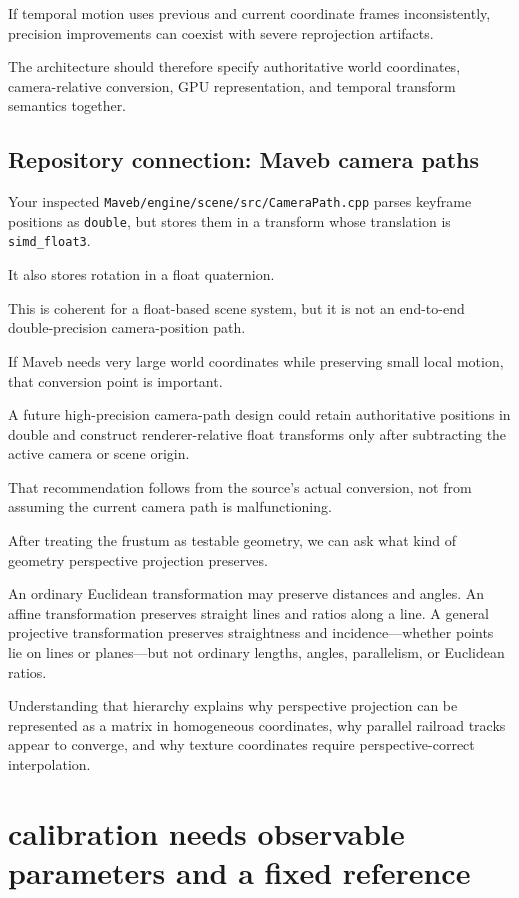 If temporal motion uses previous and current coordinate frames inconsistently, precision improvements can coexist with severe reprojection artifacts.

The architecture should therefore specify authoritative world coordinates, camera-relative conversion, GPU representation, and temporal transform semantics together.

\subsection{Repository connection: Maveb camera paths}\label{02-foundations-ii-ch036-repository-connection-maveb-camera-paths}

Your inspected \texttt{Maveb/engine/scene/src/CameraPath.cpp} parses keyframe positions as \texttt{double}, but stores them in a transform whose translation is \texttt{simd\_float3}.

It also stores rotation in a float quaternion.

This is coherent for a float-based scene system, but it is not an end-to-end double-precision camera-position path.

If Maveb needs very large world coordinates while preserving small local motion, that conversion point is important.

A future high-precision camera-path design could retain authoritative positions in double and construct renderer-relative float transforms only after subtracting the active camera or scene origin.

That recommendation follows from the source's actual conversion, not from assuming the current camera path is malfunctioning.

After treating the frustum as testable geometry, we can ask what kind of geometry perspective projection preserves.

An ordinary Euclidean transformation may preserve distances and angles. An affine transformation preserves straight lines and ratios along a line. A general projective transformation preserves straightness and incidence---whether points lie on lines or planes---but not ordinary lengths, angles, parallelism, or Euclidean ratios.

Understanding that hierarchy explains why perspective projection can be represented as a matrix in homogeneous coordinates, why parallel railroad tracks appear to converge, and why texture coordinates require perspective-correct interpolation.

\section{calibration needs observable parameters and a fixed reference}\label{02-foundations-ii-ch036-calibration-needs-observable-parameters-and-a-fixed-reference}

